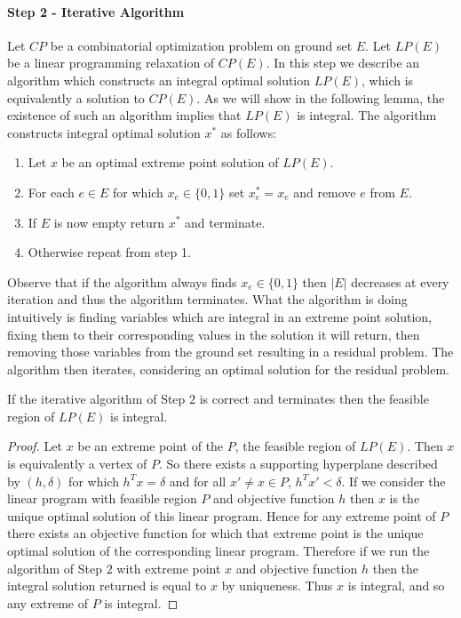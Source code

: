 \paragraph{Step 2 - Iterative Algorithm}
Let $CP$ be a combinatorial optimization problem on ground set $E$. Let $LP(E)$ be a linear programming relaxation of $CP(E)$. In this step we describe an algorithm which constructs an integral optimal solution $LP(E)$, which is equivalently a solution to $CP(E)$. As we will show in the following lemma, the existence of such an algorithm implies that $LP(E)$ is integral. The algorithm constructs integral optimal solution $x^*$ as follows:
\begin{enumerate}
\item Let $x$ be an optimal extreme point solution of $LP(E)$.
\item For each $e \in E$ for which $x_e  \in \{0,1\}$ set $x^*_e = x_e$ and remove $e$ from $E$.
\item If $E$ is now empty return $x^*$ and terminate.
\item Otherwise repeat from step 1.
\end{enumerate}
Observe that if the algorithm always finds $x_e \in \{0,1\}$ then $|E|$ decreases at every iteration and thus the algorithm terminates. What the algorithm is doing intuitively is finding variables which are integral in an extreme point solution, fixing them to their corresponding values in the solution it will return, then removing those variables from the ground set resulting in a residual problem. The algorithm then iterates, considering an optimal solution for the residual problem. 
\begin{lemma} If the iterative algorithm of Step $2$ is correct and terminates then the feasible region of $LP(E)$ is integral.
\end{lemma}
\begin{proof}
Let $x$ be an extreme point of the $P$, the feasible region of $LP(E)$. Then $x$ is equivalently a vertex of $P$. So there exists a supporting hyperplane described by $(h,\delta)$ for which $h^Tx = \delta$ and for all $x' \neq x \in P$, $h^Tx' < \delta$. If we consider the linear program with feasible region $P$ and objective function $h$ then $x$ is the unique optimal solution of this linear program. Hence for any extreme point of $P$ there exists an objective function for which that extreme point is the unique optimal solution of the corresponding linear program. Therefore if we run the algorithm of Step $2$ with extreme point $x$ and objective function $h$ then the integral solution returned is equal to $x$ by uniqueness. Thus $x$ is integral, and so any extreme of $P$ is integral. 
\end{proof}
